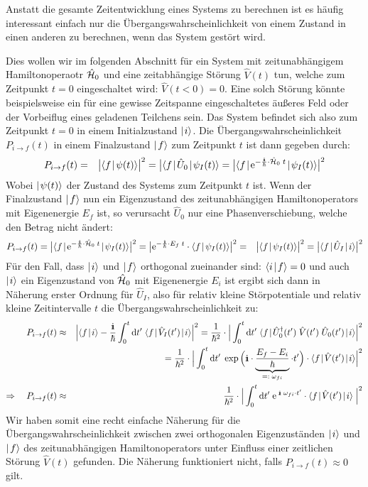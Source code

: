 Anstatt die gesamte Zeitentwicklung eines Systems zu berechnen ist es häufig interessant einfach nur die Übergangswahrscheinlichkeit von einem Zustand in einen anderen zu berechnen, wenn das System gestört wird. 

Dies wollen wir im folgenden Abschnitt für ein System mit zeitunabhängigem Hamiltonoperaotr $\hat{\mathcal H}_0$ und eine zeitabhängige Störung $\hat{V}(t)$ tun, welche zum Zeitpunkt $t=0$ eingeschaltet wird: $\hat{V}(t<0)=0$. Eine solch Störung könnte beispielsweise ein für eine gewisse Zeitspanne eingeschaltetes äußeres Feld oder der Vorbeiflug eines geladenen Teilchens sein. Das System befindet sich also zum Zeitpunkt $t=0$ in einem Initialzustand $\mid\!\!\!\,\,{i}\rangle$. Die Übergangswahrscheinlichkeit $P_{i\to f}(t)$ in einem Finalzustand $\mid\!\!\!\,\,{f}\rangle$ zum Zeitpunkt $t$ ist dann gegeben durch: 
\begin{eqnarray*}
	P_{i\to f}(t) &=& \big|\braket{f}{\psi(t)}\big|^2 = \big|\bracket{f}{\hat{U}_0}{\psi_I(t)} = \big|\bracket{f}{\e^{-\frac{\I}{\hbar}\cdot \hat{\ham}_0\;t}}{\psi_I(t)}\big|^2
\end{eqnarray*}
Wobei $\mid\!\!\!\,\,{\psi(t)}\rangle$ der Zustand des Systems zum Zeitpunkt $t$ ist. Wenn der Finalzustand $\mid\!\!\!\,\,{f}\rangle$ nun ein Eigenzustand des zeitunabhängigen Hamiltonoperators mit Eigenenergie $E_f$ ist, so verursacht $\hat{U}_0$ nur eine Phasenverschiebung, welche den Betrag nicht ändert: 
\begin{eqnarray*}
	P_{i\rightarrow f}(t)=\big|\bracket{f}{\e^{-\frac{\I}{\hbar}\cdot \hat{\ham}_0\;t}}{\psi_I(t)}\big|^2 = \big|\e^{-\frac{\I}{\hbar}\cdot E_f\;t}\cdot\braket{f}{\psi_I(t)}\big|^2 &=& \big|\braket{f}{\psi_I(t)}\big|^2 = \big|\bracket{f}{\hat{U}_I}{i}\big|^2 
\end{eqnarray*}
Für den Fall, dass $\mid\!\!\!\,\,{i}\rangle$ und $\mid\!\!\!\,\,{f}\rangle$ orthogonal zueinander sind: $\langle{i}\!\!\!\,\,\mid\!\!\!\,\,{f}\rangle=0$ und auch $\mid\!\!\!\,\,{i}\rangle$ ein Eigenzustand von $\hat{\mathcal H}_0$ mit Eigenenergie $E_i$ ist ergibt sich dann in Näherung erster Ordnung für $\hat{U}_I$, also für relativ kleine Störpotentiale und relativ kleine Zeitintervalle $t$ die Übergangswahrscheinlichkeit zu: 
\begin{eqnarray}
	P_{i\to f}(t) &\approx& \Big|\braket{f}{i} - \frac{\I}{\hbar} \int_0^t\mathrm{d}t'\; \bracket{f}{\hat{V}_I(t')}{i} \Big|^2 = \frac{1}{\hbar^2}\cdot \Big|\int_0^t\mathrm{d}t'\; \bracket{f}{\hat{U}^{\dagger}_0(t')\;\hat{V}(t')\;\hat{U}_0(t')}{i} \Big|^2 \nonumber
	\\
	&& \qquad\qquad= \frac{1}{\hbar^2}\cdot \Big|\int_0^t\mathrm{d}t'\; \exp\Big(\I\cdot\underbrace{\frac{E_f-E_i}{\hbar}}_{=:\;\omega_{fi}}\cdot t'\Big) \cdot\bracket{f}{\hat{V}(t')}{i} \Big|^2 \nonumber
	\\
	\Rightarrow\quad P_{i\to f}(t) &\approx& \frac{1}{\hbar^2}\cdot \Big|\int_0^t\mathrm{d}t'\; \e^{\;\I\;\omega_{fi}\cdot t'} \cdot\bracket{f}{\hat{V}(t')}{i}\;\Big|^2 \label{Uebergangswahrscheinlichkeit} 
\end{eqnarray} 
Wir haben somit eine recht einfache Näherung für die Übergangswahrscheinlichkeit zwischen zwei orthogonalen Eigenzuständen $\mid\!\!\!\,\,{i}\rangle$ und $\mid\!\!\!\,\,{f}\rangle$ des zeitunabhängigen Hamiltonoperators unter Einfluss einer zeitlichen Störung $\hat{V}(t)$ gefunden. Die Näherung funktioniert nicht, falls $P_{i\rightarrow f}(t)\approx0$ gilt. 


